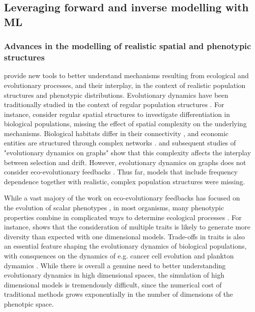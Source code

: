 \subsection{Leveraging forward and inverse modelling with ML}

\subsubsection{Advances in the modelling of realistic spatial and phenotypic structures}

\Cref{\chapi,\chapiv} provide new tools to better understand mechanisms resulting from ecological and evolutionary processes, and their interplay, in the context of realistic population structures and phenotypic distributions.
% 
Evolutionary dynamics have been traditionally studied in the context of regular population structures \citep{LiebermanHauert2005}.
% 
For instance, \cite{Slatkin1973,Slatkin1978,Kirkpatrick1997,Polechova2015,Polechova2018,AndradeRestrepo2019,Doebeli2003,Meszena1997,Yeaman2011,Debarre2013,Mirrahimi2020} consider regular spatial structures to investigate differentiation in biological populations, missing the effect of spatial complexity on the underlying mechanisms.
% 
Biological habitats differ in their connectivity \xxx, and economic entities are structured through complex networks \xxx. \cite{LiebermanHauert2005} and subsequent studies of "evolutionary dynamics on graphs" \xxx show that this complexity affects the interplay between selection and drift. However, evolutionary dynamics on graphs does not consider eco-evolutionary feedbacks \citep{Govaert2019a}.
% 
Thus far, models that include frequency dependence together with realistic, complex population structures were missing.

While a vast majory of the work on eco-evolutionary feedbacks has focused on the evolution of scalar phenotypes \citep{Doebeli2011}, in most organisms, many phenotypic properties combine in complicated ways to determine ecological processes \citep{Doebeli2014}.
% 
For instance, \cite{Doebeli2011} shows that the consideration of multiple traits is likely to generate more diversity than expected with one dimensional models.
% 
% 
Trade-offs in traits is also an essential feature shaping the evolutionary dynamics of biological populations, with consquences on the dynamics of e.g. cancer cell evolution \xxx and plankton dymamics \xxx.
% 
While there is overall a genuine need to better understanding evolutionary dynamics in high dimensional spaces, the simulation of high dimensional models is tremendously difficult, since the numerical cost of traditional methods grows exponentially in the number of dimensions of the phenotpic space. 
% 

